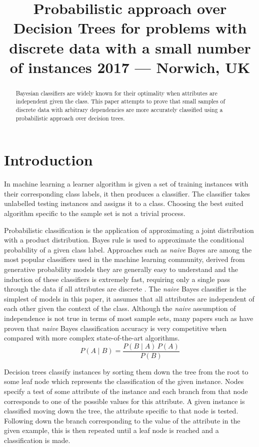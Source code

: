 \documentclass{cmppgr}
\title{Probabilistic approach over Decision Trees for problems with discrete data with a small number of instances 2017 --- Norwich, UK}
\begin{document}
\maketitle

\begin{abstract}

Bayesian classifiers are widely known for their optimality when attributes are independent given the class. This paper attempts to prove that small samples of discrete data with arbitrary dependencies are more accurately classified using a probabilistic approach over decision trees. 


\end{abstract}


\section{Introduction}

In machine learning a learner algorithm is given a set of training instances with their corresponding class labels, it then produces a classifier. The classifier takes unlabelled testing instances and assigns it to a class. Choosing the best suited algorithm specific to the sample set is not a trivial process. 

Probabilistic classification is the application of approximating a joint distribution with a product distribution. Bayes rule is used to approximate the conditional probability of a given class label. Approaches such as \textit{naive} Bayes are among the most popular classifiers used in the machine learning community, derived from generative probability models they are generally easy to understand and the induction of these classifiers is extremely fast, requiring only a single pass through the data if all attributes are discrete \cite{kohavi1996scaling}. The \textit{naive} Bayes classifier is the simplest of models in this paper, it assumes that all attributes are independent of each other given the context of the class. Although the \textit{naive} assumption of independence is not true in terms of most sample sets, many papers such as \cite{domingos1997optimality} have proven that \textit{naive} Bayes classification accuracy is very competitive when compared with more complex state-of-the-art algorithms. 
$$ P(A \mid B) = \frac{P(B \mid A) \, P(A)}{P(B)} $$
 

Decision trees classify instances by sorting them down the tree from the root to some leaf node which represents the classification of the given instance. Nodes specify a test of some attribute of the instance and each branch from that node corresponds to one of the possible values for this attribute. A given instance is classified moving down the tree, the attribute specific to that node is tested. Following down the branch corresponding to the value of the attribute in the given example, this is then repeated until a leaf node is reached and a classification is made.
\end{document}
